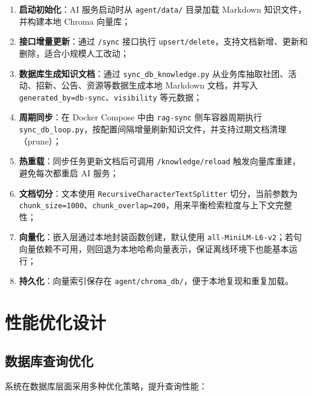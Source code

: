 \begin{enumerate}
  \item \textbf{启动初始化}：AI 服务启动时从 \texttt{agent/data/} 目录加载 Markdown 知识文件，并构建本地 Chroma 向量库；

  \item \textbf{接口增量更新}：通过 \texttt{/sync} 接口执行 \texttt{upsert/delete}，支持文档新增、更新和删除，适合小规模人工改动；

  \item \textbf{数据库生成知识文档}：通过 \texttt{sync\_}\allowbreak\texttt{db\_}\allowbreak\texttt{knowledge.py} 从业务库抽取社团、活动、招新、公告、资源等数据生成本地 Markdown 文档，并写入 \texttt{generated\_}\allowbreak\texttt{by=db-sync}、\allowbreak\texttt{visibility} 等元数据；

  \item \textbf{周期同步}：在 Docker Compose 中由 \texttt{rag-}\allowbreak\texttt{sync} 侧车容器周期执行 \texttt{sync\_}\allowbreak\texttt{db\_}\allowbreak\texttt{loop.py}，按配置间隔增量刷新知识文件，并支持过期文档清理（prune）；

  \item \textbf{热重载}：同步任务更新文档后可调用 \texttt{/knowledge/reload} 触发向量库重建，避免每次都重启 AI 服务；

  \item \textbf{文档切分}：文本使用 \texttt{RecursiveCharacterTextSplitter} 切分，当前参数为 \texttt{chunk\_size=1000}、\texttt{chunk\_overlap=200}，用来平衡检索粒度与上下文完整性；

  \item \textbf{向量化}：嵌入层通过本地封装函数创建，默认使用 \texttt{all-MiniLM-L6-v2}；若句向量依赖不可用，则回退为本地哈希向量表示，保证离线环境下也能基本运行；

  \item \textbf{持久化}：向量索引保存在 \texttt{agent/chroma\_db/}，便于本地复现和重复加载。
\end{enumerate}

\section{性能优化设计}

\subsection{数据库查询优化}

系统在数据库层面采用多种优化策略，提升查询性能：

